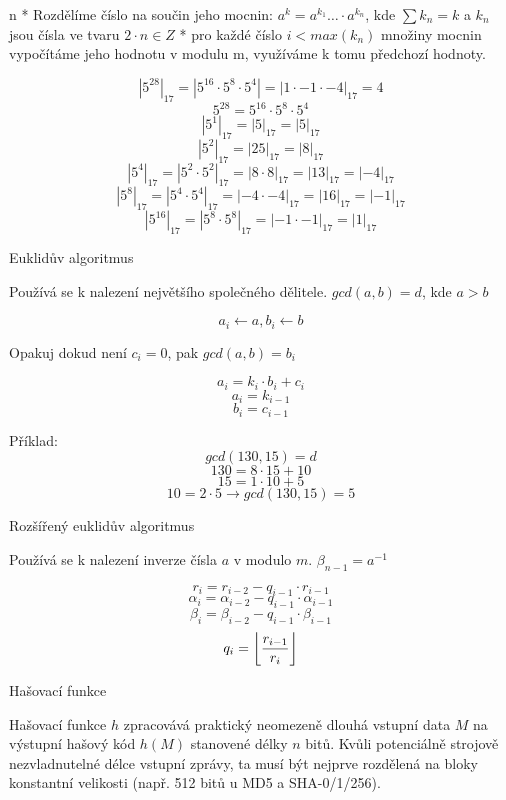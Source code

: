 \begitems \style n
* Rozdělíme číslo na součin jeho mocnin: $a^k=a^{k_1} \ldots \cdot a^{k_n}$, kde $\sum k_n = k$ a $k_n$ jsou čísla ve tvaru $2 \cdot n \in Z$
* pro každé číslo $i < max(k_n)$ množiny mocnin vypočítáme jeho hodnotu v modulu m, využíváme k tomu předchozí hodnoty.
\enditems

$$\left|5^{28}\right|_{17} = \left|5^{16} \cdot 5^8 \cdot 5^4\right| = \left|1 \cdot -1 \cdot -4\right|_{17} = 4$$
$$5^{28} = 5^{16} \cdot 5^8 \cdot 5^4$$
$$\left|5^1\right|_{17} = \left|5 \right|_{17} = \left|5\right|_{17}$$
$$\left|5^2\right|_{17} = \left|25 \right|_{17} = \left|8\right|_{17}$$
$$\left|5^4\right|_{17} = \left|5^2 \cdot 5^2\right|_{17} = \left|8 \cdot 8\right|_{17} = \left|13\right|_{17} = \left|-4\right|_{17}$$
$$\left|5^8\right|_{17} = \left|5^4 \cdot 5^4\right|_{17} = \left|-4 \cdot -4\right|_{17} = \left|16\right|_{17} = \left|-1\right|_{17}$$
$$\left|5^{16}\right|_{17} = \left|5^8 \cdot 5^8\right|_{17} = \left|-1 \cdot -1\right|_{17} = \left|1\right|_{17}$$

\sec Euklidův algoritmus

Používá se k nalezení největšího společného dělitele. $gcd(a,b) = d$, kde $a > b$

$$a_i \leftarrow a, b_i \leftarrow b$$
\centerline{Opakuj dokud není $c_i = 0$, pak $gcd(a,b) = b_i$}
$$a_i = k_i \cdot b_i + c_i$$
$$a_i = k_{i-1}$$
$$b_i = c_{i-1}$$

\noindent
Příklad:
$$gcd(130,15) = d$$
$$130 = 8 \cdot 15 + 10$$
$$15 = 1 \cdot 10 + 5$$
$$10 = 2 \cdot 5 \rightarrow gcd(130,15) = 5$$

\sec Rozšířený euklidův algoritmus

Používá se k nalezení inverze čísla $a$ v modulo $m$. $\beta_{n-1} = a^{-1}$



$$r_i = r_{i-2} - q_{i-1} \cdot r_{i-1}$$
$$\alpha_i = \alpha_{i-2} - q_{i-1} \cdot \alpha_{i-1}$$
$$\beta_i = \beta_{i-2} - q_{i-1} \cdot \beta_{i-1}$$
$$q_i = \left\lfloor r_{i-1} \over r_i \right\rfloor$$

\endmulti

\chap Hašovací funkce

Hašovací funkce $h$ zpracovává praktický neomezeně dlouhá vstupní data $M$ na výstupní hašový kód $h(M)$ stanovené délky $n$ bitů.
Kvůli potenciálně strojově nezvladnutelné délce vstupní zprávy, ta musí být nejprve rozdělená na bloky konstantní velikosti (např. 512 bitů u MD5 a SHA-0/1/256).

